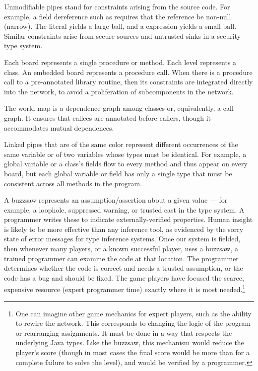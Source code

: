 \documentclass{sig-alternate}
\def\<#1>{\codeid{#1}}
\newcommand{\codeid}[1]{\ifmmode{\mbox{\ttfamily{#1}}}\else{\ttfamily #1}\fi}
\begin{document}
Unmodifiable pipes stand for constraints arising from the source code.
For example, a field dereference such as \<x.f> requires that the
reference \<x> be non-null (narrow).  The literal \<null> yields a
large ball, and a \<new> expression yields a small ball.  Similar
constraints arise from secure sources and untrusted sinks in a
security type system.

Each board represents a single procedure or method.  Each level
represents a class.  An embedded board represents a procedure call.
When there is a procedure call to a pre-annotated library routine,
then its constraints are integrated directly into the network, to
avoid a proliferation of subcomponents in the network.

The world map is a dependence graph among classes or, equivalently, a
call graph.  It ensures that callees are annotated before callers,
though it accommodates mutual dependences.

Linked pipes that are of the same color represent different
occurrences of the same variable or of two variables whose types must
be identical.  For example, a global variable or a class's fields flow
to every method and thus appear on every board, but each global
variable or field has only a single type that must be consistent
across all methods in the program.

A buzzsaw represents an assumption/assertion about a given value --- for
example, a loophole, suppressed warning, or trusted cast in the type
system.  A programmer writes these to indicate externally-verified
properties.  Human insight is likely to be
more effective than any inference tool, as evidenced by the sorry
state of error messages for type inference systems.  Once our system is
fielded, then whenever many
players, or a known successful player, uses a buzzsaw, a trained
programmer can examine the code at that
location.  The programmer determines whether the code is
correct and needs a trusted assumption, or the code has a bug and
should be fixed.  The game players have focused the scarce, expensive
resource (expert programmer time) exactly where it is most
needed.\footnote{One can imagine other game mechanics for expert
  players, such as the ability to rewire the network.  This
  corresponds to changing the logic of the program or rearranging
  assignments.  It must be done in a way that respects the underlying
  Java types.  Like the buzzsaw, this mechanism would reduce the
  player's score (though in most cases the final score would be more
  than for a complete failure to solve the level), and would be
  verified by a programmer.}
\end{document}
